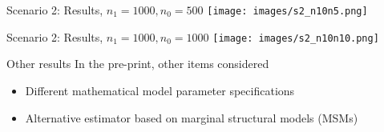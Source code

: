 \documentclass{beamer}
\begin{document}
\begin{frame}{Scenario 2: Results, $n_1 = 1000,n_0 = 500$}
	\centering
	\texttt{[image: images/s2\_n10n5.png]}
\end{frame}

\begin{frame}{Scenario 2: Results, $n_1 = 1000,n_0 = 1000$}
	\centering
	\texttt{[image: images/s2\_n10n10.png]}
\end{frame}

\begin{frame}{Other results}
	In the pre-print, other items considered
	\begin{itemize}
		\item Different mathematical model parameter specifications
		\item Alternative estimator based on marginal structural models (MSMs)
	\end{itemize}
\end{frame}
\end{document}
